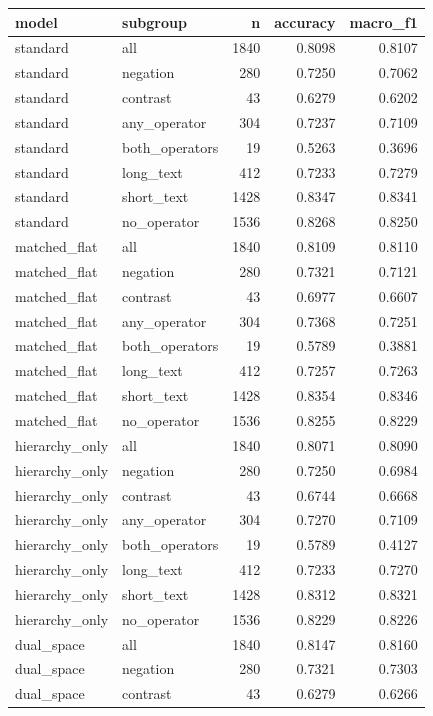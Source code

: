 \begin{tabular}{llrrr}
\toprule
model & subgroup & n & accuracy & macro\_f1 \\
\midrule
standard & all & 1840 & 0.8098 & 0.8107 \\
standard & negation & 280 & 0.7250 & 0.7062 \\
standard & contrast & 43 & 0.6279 & 0.6202 \\
standard & any\_operator & 304 & 0.7237 & 0.7109 \\
standard & both\_operators & 19 & 0.5263 & 0.3696 \\
standard & long\_text & 412 & 0.7233 & 0.7279 \\
standard & short\_text & 1428 & 0.8347 & 0.8341 \\
standard & no\_operator & 1536 & 0.8268 & 0.8250 \\
matched\_flat & all & 1840 & 0.8109 & 0.8110 \\
matched\_flat & negation & 280 & 0.7321 & 0.7121 \\
matched\_flat & contrast & 43 & 0.6977 & 0.6607 \\
matched\_flat & any\_operator & 304 & 0.7368 & 0.7251 \\
matched\_flat & both\_operators & 19 & 0.5789 & 0.3881 \\
matched\_flat & long\_text & 412 & 0.7257 & 0.7263 \\
matched\_flat & short\_text & 1428 & 0.8354 & 0.8346 \\
matched\_flat & no\_operator & 1536 & 0.8255 & 0.8229 \\
hierarchy\_only & all & 1840 & 0.8071 & 0.8090 \\
hierarchy\_only & negation & 280 & 0.7250 & 0.6984 \\
hierarchy\_only & contrast & 43 & 0.6744 & 0.6668 \\
hierarchy\_only & any\_operator & 304 & 0.7270 & 0.7109 \\
hierarchy\_only & both\_operators & 19 & 0.5789 & 0.4127 \\
hierarchy\_only & long\_text & 412 & 0.7233 & 0.7270 \\
hierarchy\_only & short\_text & 1428 & 0.8312 & 0.8321 \\
hierarchy\_only & no\_operator & 1536 & 0.8229 & 0.8226 \\
dual\_space & all & 1840 & 0.8147 & 0.8160 \\
dual\_space & negation & 280 & 0.7321 & 0.7303 \\
dual\_space & contrast & 43 & 0.6279 & 0.6266 \\

\end{tabular}
